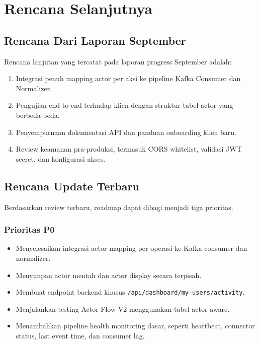 \chapter{Rencana Selanjutnya}

\section{Rencana Dari Laporan September}

Rencana lanjutan yang tercatat pada laporan progress September adalah:

\begin{enumerate}
    \item Integrasi penuh mapping actor per aksi ke pipeline Kafka Consumer dan Normalizer.
    \item Pengujian end-to-end terhadap klien dengan struktur tabel actor yang berbeda-beda.
    \item Penyempurnaan dokumentasi API dan panduan onboarding klien baru.
    \item Review keamanan pra-produksi, termasuk CORS whitelist, validasi JWT secret, dan konfigurasi akses.
\end{enumerate}

\roadmapdiagram

\section{Rencana Update Terbaru}

Berdasarkan review terbaru, roadmap dapat dibagi menjadi tiga prioritas.

\subsection{Prioritas P0}

\begin{itemize}
    \item Menyelesaikan integrasi actor mapping per operasi ke Kafka consumer dan normalizer.
    \item Menyimpan actor mentah dan actor display secara terpisah.
    \item Membuat endpoint backend khusus \texttt{/api/dashboard/my-users/activity}.
    \item Menjalankan testing Actor Flow V2 menggunakan tabel actor-aware.
    \item Menambahkan pipeline health monitoring dasar, seperti heartbeat, connector status, last event time, dan consumer lag.
\end{itemize}

